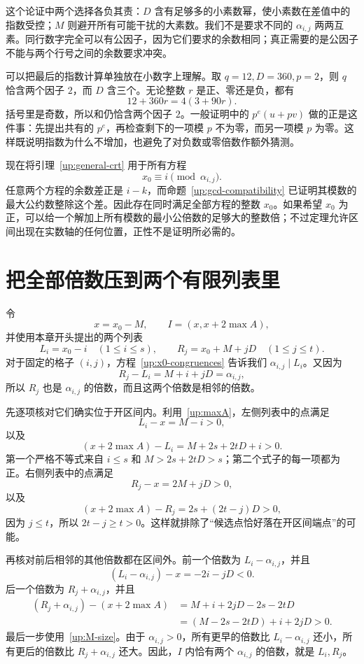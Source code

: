 \documentclass[UTF8,a4paper,oneside,openany,fontset=fandol,zihao=-4]{ctexbook}
\theoremstyle{guide}
\begin{document}
这个论证中两个选择各负其责：$D$ 含有足够多的小素数幂，使小素数在差值中的指数受控；$M$ 则避开所有可能干扰的大素数。我们不是要求不同的 $\alpha_{i,j}$ 两两互素。同行数字完全可以有公因子，因为它们要求的余数相同；真正需要的是公因子不能与两个行号之间的余数要求冲突。

可以把最后的指数计算单独放在小数字上理解。取 $q=12,D=360,p=2$，则 $q$ 恰含两个因子 $2$，而 $D$ 含三个。无论整数 $r$ 是正、零还是负，都有
\[
12+360r=4(3+90r).
\]
括号里是奇数，所以和仍恰含两个因子 $2$。一般证明中的 $p^e(u+pv)$ 做的正是这件事：先提出共有的 $p^e$，再检查剩下的一项模 $p$ 不为零，而另一项模 $p$ 为零。这样既说明指数为什么不增加，也避免了对负数或零倍数作额外猜测。

现在将引理~\ref{up:general-crt} 用于所有方程
\begin{equation}\label{up:x0-congruences}
x_0\equiv i\pmod{\alpha_{i,j}}.
\end{equation}
任意两个方程的余数差正是 $i-k$，而命题~\ref{up:gcd-compatibility} 已证明其模数的最大公约数整除这个差。因此存在同时满足全部方程的整数 $x_0$。如果希望 $x_0$ 为正，可以给一个解加上所有模数的最小公倍数的足够大的整数倍；不过定理允许区间出现在实数轴的任何位置，正性不是证明所必需的。

\section{把全部倍数压到两个有限列表里}\label{up:interval}

令
\[
x=x_0-M,\qquad I=(x,x+2\max A),
\]
并使用本章开头提出的两个列表
\[
L_i=x_0-i\quad(1\leq i\leq s),\qquad
R_j=x_0+M+jD\quad(1\leq j\leq t).
\]
对于固定的格子 $(i,j)$，方程~\eqref{up:x0-congruences} 告诉我们 $\alpha_{i,j}\mid L_i$。又因为
\[
R_j-L_i=M+i+jD=\alpha_{i,j},
\]
所以 $R_j$ 也是 $\alpha_{i,j}$ 的倍数，而且这两个倍数是相邻的倍数。

先逐项核对它们确实位于开区间内。利用~\eqref{up:maxA}，左侧列表中的点满足
\[
L_i-x=M-i>0,
\]
以及
\[
(x+2\max A)-L_i=M+2s+2tD+i>0.
\]
第一个严格不等式来自 $i\leq s$ 和 $M>2s+2tD>s$；第二个式子的每一项都为正。右侧列表中的点满足
\[
R_j-x=2M+jD>0,
\]
以及
\[
(x+2\max A)-R_j=2s+(2t-j)D>0,
\]
因为 $j\leq t$，所以 $2t-j\geq t>0$。这样就排除了“候选点恰好落在开区间端点”的可能。

再核对前后相邻的其他倍数都在区间外。前一个倍数为 $L_i-\alpha_{i,j}$，并且
\[
(L_i-\alpha_{i,j})-x=-2i-jD<0.
\]
后一个倍数为 $R_j+\alpha_{i,j}$，并且
\begin{align*}
(R_j+\alpha_{i,j})-(x+2\max A)
&=M+i+2jD-2s-2tD\\
&=(M-2s-2tD)+i+2jD>0.
\end{align*}
最后一步使用~\eqref{up:M-size}。由于 $\alpha_{i,j}>0$，所有更早的倍数比 $L_i-\alpha_{i,j}$ 还小，所有更后的倍数比 $R_j+\alpha_{i,j}$ 还大。因此，$I$ 内恰有两个 $\alpha_{i,j}$ 的倍数，就是 $L_i,R_j$。
\end{document}
